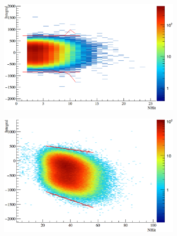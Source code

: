 \begin{appendices}
\begin{figure}[htbp]
    \centering
    \begin{subfigure}[b]{0.48\textwidth}
        \centering
        \includegraphics[width=\textwidth]{caen_pgt}
        \caption[]{}
    \end{subfigure}
    \hfill
    \begin{subfigure}[b]{0.48\textwidth}
        \centering
        \includegraphics[width=\textwidth]{caen_n16}
        \caption[]{}
    \end{subfigure}


\end{figure}
\end{appendices}
